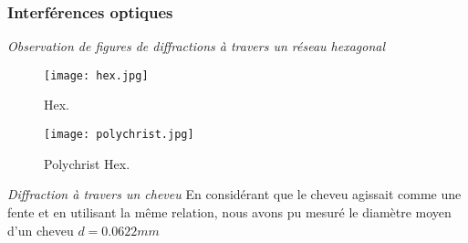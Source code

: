 \documentclass{beamer}
\begin{document}
\begin{frame}
\frametitle{Interférences optiques}

\emph{Observation de figures de diffractions à travers un réseau hexagonal}
\begin{minipage}[t]{0.46\textwidth}
	\begin{figure}
		\centering
		\texttt{[image: hex.jpg]}
		\caption{Hex.}
	\end{figure}
\end{minipage}
\begin{minipage}[t]{0.46\textwidth}
	\begin{figure}
		\centering
		\texttt{[image: polychrist.jpg]}
		\caption{Polychrist Hex.}
	\end{figure}
\end{minipage}

\emph{Diffraction à travers un cheveu}
\newline
En considérant que le cheveu agissait comme une fente et en utilisant la même relation, nous avons pu mesuré le diamètre moyen d'un cheveu $d=0.0622mm$


\end{frame}
\end{document}
